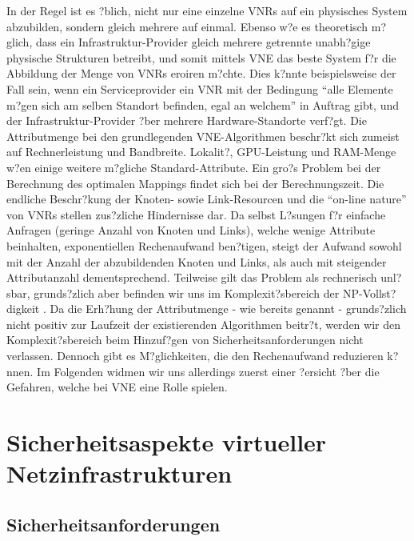 \documentclass{lni}
\begin{document}
In der Regel ist es ?blich, nicht nur eine einzelne VNRs auf ein physisches System abzubilden, sondern gleich mehrere auf einmal. Ebenso w?e es theoretisch m?glich, dass ein Infrastruktur-Provider gleich mehrere getrennte unabh?gige physische Strukturen betreibt, und somit mittels VNE das beste System f?r die Abbildung der Menge von VNRs eroiren m?chte. Dies k?nnte beispielsweise der Fall sein, wenn ein Serviceprovider ein VNR mit der Bedingung "`alle Elemente m?gen sich am selben Standort befinden, egal an welchem"' in Auftrag gibt, und der Infrastruktur-Provider ?ber mehrere Hardware-Standorte verf?gt.
\newline
Die Attributmenge bei den grundlegenden VNE-Algorithmen beschr?kt  sich zumeist auf Rechnerleistung und Bandbreite. 
Lokalit?, GPU-Leistung und RAM-Menge w?en einige weitere m?gliche Standard-Attribute. Ein gro?s Problem bei der Berechnung des optimalen Mappings findet sich bei der Berechnungszeit. Die endliche Beschr?kung der Knoten- sowie Link-Resourcen und die "`on-line nature"' von VNRs stellen zus?zliche Hindernisse dar. Da selbst L?sungen f?r einfache Anfragen (geringe Anzahl von Knoten und Links), welche wenige Attribute beinhalten, exponentiellen Rechenaufwand ben?tigen, steigt der Aufwand sowohl mit der Anzahl der abzubildenden Knoten und Links, als auch mit steigender Attributanzahl dementsprechend. Teilweise gilt das Problem als rechnerisch unl?sbar, grunds?zlich aber befinden wir uns im Komplexit?sbereich der NP-Vollst?digkeit \cite{SVNE2}. Da die Erh?hung der Attributmenge - wie bereits genannt - grunds?zlich nicht positiv zur Laufzeit der existierenden Algorithmen beitr?t, werden wir den Komplexit?sbereich beim Hinzuf?gen von Sicherheitsanforderungen nicht verlassen. Dennoch gibt es M?glichkeiten, die den Rechenaufwand reduzieren k?nnen. Im Folgenden widmen wir uns allerdings zuerst einer ?ersicht ?ber die Gefahren, welche bei VNE eine Rolle spielen.



\section{Sicherheitsaspekte virtueller Netzinfrastrukturen}
\label{sec:gefahren}

\subsection{Sicherheitsanforderungen}
\label{subsec:gefahren_anforderungen}

\end{document}
